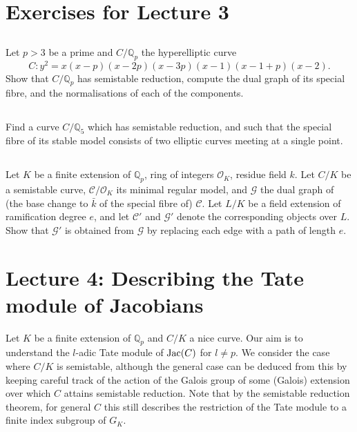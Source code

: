\documentclass[12pt]{amsart}
\numberwithin{equation}{section}
\theoremstyle{remark}
\theoremstyle{definition}
\theoremstyle{definition}
\theoremstyle{definition}
\theoremstyle{definition}
\theoremstyle{definition}
\theoremstyle{definition}
\begin{document}
\newpage

\section{Exercises for Lecture 3}

\subsection{}
Let $p>3$ be a  prime and $C/\mathbb{Q}_p$ the hyperelliptic curve 
\[C:y^2=x(x-p)(x-2p)(x-3p)(x-1)(x-1+p)(x-2).\]
Show that $C/\mathbb{Q}_p$ has semistable reduction, compute the dual graph of its special fibre, and the normalisations of each of the components.


\subsection{} Find a curve $C/\mathbb{Q}_5$ which has semistable reduction, and such that the special fibre of its stable model consists of two elliptic curves meeting at a single point.

\subsection{}
Let $K$ be a finite extension of $\mathbb{Q}_p$, ring of integers $\mathcal{O}_K$, residue field $k$. Let $C/K$ be a semistable curve, $\mathcal{C}/\mathcal{O}_K$ its minimal regular model, and $\mathcal{G}$ the dual graph of (the base change to $\bar{k}$ of the special fibre of) $\mathcal{C}$. Let $L/K$ be a field extension of ramification degree $e$, and let $\mathcal{C}'$ and $\mathcal{G}'$ denote the corresponding objects over $L$. Show that $\mathcal{G}'$ is obtained from $\mathcal{G}$ by replacing each edge with a path of length $e$. 

\newpage

\newpage

\section{Lecture 4: Describing the Tate module of Jacobians}

Let $K$ be a finite extension of $\mathbb{Q}_p$ and $C/K$ a nice curve. Our aim is to understand the $l$-adic Tate module of $\textup{Jac}(C)$ for $l\neq p$.  We  consider the case where $C/K$ is semistable, although the general case can be deduced from this by keeping careful track of the action of the Galois group of some (Galois) extension over which $C$ attains semistable reduction. Note that by the semistable reduction theorem, for general $C$ this still describes the restriction of the Tate module to a finite index subgroup of $G_K$. 
\end{document}
